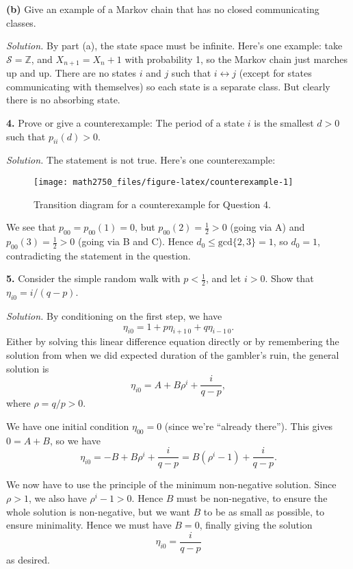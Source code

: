 \documentclass[
  a4paper,
]{article}
\theoremstyle{definition}
\theoremstyle{definition}
\theoremstyle{definition}
\theoremstyle{remark}
\begin{document}
\textbf{(b)} Give an example of a Markov chain that has no closed communicating classes.

\begin{myanswers}

\emph{Solution.} By part (a), the state space must be infinite. Here's one example: take \(\mathcal S = \mathbb Z\), and \(X_{n+1} = X_n + 1\) with probability 1, so the Markov chain just marches up and up. There are no states \(i\) and \(j\) such that \(i \leftrightarrow j\) (except for states communicating with themselves) so each state is a separate class. But clearly there is no absorbing state.

\end{myanswers}

\textbf{4.} Prove or give a counterexample: The period of a state \(i\) is the smallest \(d > 0\) such that \(p_{ii}(d) > 0\).

\begin{myanswers}

\emph{Solution.} The statement is not true. Here's one counterexample:

\begin{figure}

{\centering \texttt{[image: math2750\_files/figure-latex/counterexample-1]} 

}

\caption{Transition diagram for a counterexample for Question 4.}\label{fig:counterexample}
\end{figure}

We see that \(p_{00} = p_{00}(1) = 0\), but \(p_{00}(2) = \frac12 > 0\) (going via A) and \(p_{00}(3) = \frac12 > 0\) (going via B and C). Hence \(d_0 \leq \text{gcd}\{2,3\} = 1\), so \(d_0 = 1\), contradicting the statement in the question.

\end{myanswers}

\textbf{5.} Consider the simple random walk with \(p < \frac12\), and let \(i > 0\). Show that
\(\eta_{i0} = i/(q-p)\).

\begin{myanswers}

\emph{Solution.} By conditioning on the first step, we have
\[ \eta_{i0} = 1 + p\eta_{i+1\,0} + q\eta_{i-1\,0} . \]
Either by solving this linear difference equation directly or by remembering the solution from when we did expected duration of the gambler's ruin, the general solution is
\[ \eta_{i0} = A + B\rho^i + \frac{i}{q-p} , \]
where \(\rho = q/p > 0\).

We have one initial condition \(\eta_{00} = 0\) (since we're ``already there''). This gives \(0 = A + B\), so we have
\[ \eta_{i0} = -B + B\rho^i + \frac{i}{q-p} = B(\rho^i - 1) + \frac{i}{q-p} . \]

We now have to use the principle of the minimum non-negative solution. Since \(\rho > 1\), we also have \(\rho^i - 1 > 0\). Hence \(B\) must be non-negative, to ensure the whole solution is non-negative, but we want \(B\) to be as small as possible, to ensure minimality. Hence we must have \(B = 0\), finally giving the solution
\[ \eta_{i0} = \frac{i}{q-p} \]
as desired.

\end{myanswers}
\end{document}

